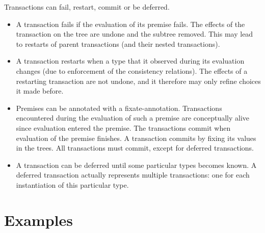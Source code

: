 \documentclass[preprint,natbib]{sigplanconf}
\begin{document}
\begin{description}
      Transactions can fail, restart, commit or be deferred.
      \begin{itemize}
      \item A transaction fails if the
        evaluation of its premise fails. The effects of the transaction on the
        tree are undone and the subtree removed. This may lead to restarts of
        parent transactions (and their nested transactions).
      \item A transaction restarts when a type that it observed during its
        evaluation changes (due to enforcement of the consistency relations). The
       effects of a restarting transaction are not undone, and it therefore may
        only refine choices it made before.
      \item Premises can be annotated with a fixate-annotation. Transactions
        encountered during the evaluation of such a premise are conceptually
        alive since evaluation entered the premise. The transactions commit
        when evaluation of the premise finishes. A transaction commits by fixing
        its values in the trees. All transactions must commit, except for
        deferred transactions.
      \item A transaction can be deferred until some particular types becomes
        known. A deferred transaction actually represents multiple transactions:
        one for each instantiation of this particular type.
      \end{itemize}
  \end{description}
  
\section{Examples}
\end{document}

